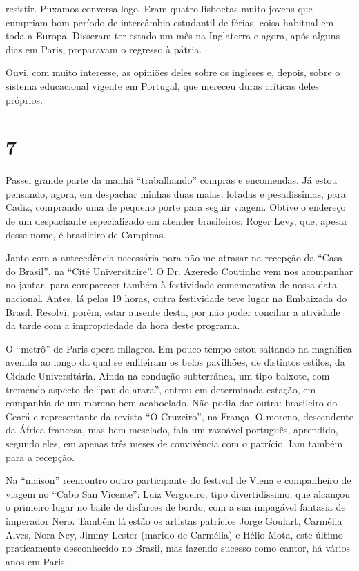 resistir. Puxamos conversa logo. Eram quatro lisboetas muito jovens que cumpriam bom período de intercâmbio estudantil de férias, coisa habitual em toda a Europa. Disseram ter estado um mês na Inglaterra e agora, após alguns dias em Paris, preparavam o regresso à pátria.

Ouvi, com muito interesse, as opiniões deles sobre os ingleses e, depois, sobre o sistema educacional vigente em Portugal, que mereceu duras críticas deles próprios.

\section*{7 \adfflatleafright {}}
Passei grande parte da manhã ``trabalhando'' compras e encomendas. Já estou pensando, agora, em despachar minhas duas malas, lotadas e pesadíssimas, para Cadiz, comprando uma de pequeno porte para seguir viagem. Obtive o endereço de um despachante especializado em atender brasileiros: Roger Levy, que, apesar desse nome, é brasileiro de Campinas.

Janto com a antecedência necessária para não me atrasar na recepção da ``Casa do Brasil'', na ``Cité Universitaire''. O Dr. Azeredo Coutinho vem nos acompanhar no jantar, para comparecer também à festividade comemorativa de nossa data nacional. Antes, lá pelas 19 horas, outra festividade teve lugar na Embaixada do Brasil. Resolvi, porém, estar ausente desta, por não poder conciliar a atividade da tarde com a impropriedade da hora deste programa.

O ``metrô'' de Paris opera milagres. Em pouco tempo estou saltando na magnífica avenida ao longo da qual se enfileiram os belos pavilhões, de distintos estilos, da Cidade Universitária. Ainda na condução subterrânea, um tipo baixote, com tremendo aspecto de ``pau de arara'', entrou em determinada estação, em companhia de um moreno bem acaboclado. Não podia dar outra: brasileiro do Ceará e representante da revista ``O Cruzeiro'', na França. O moreno, descendente da África francesa, mas bem mesclado, fala um razoável português, aprendido, segundo eles, em apenas três meses de convivência com o patrício. Iam também para a recepção.

Na ``maison'' reencontro outro participante do festival de Viena e companheiro de viagem no ``Cabo San Vicente'': Luiz Vergueiro, tipo divertidíssimo, que alcançou o primeiro lugar no baile de disfarces de bordo, com a sua impagável fantasia de imperador Nero. Também lá estão os artistas patrícios Jorge Goulart, Carmélia Alves, Nora Ney, Jimmy Lester (marido de Carmélia) e Hélio Mota, este último praticamente desconhecido no Brasil, mas fazendo sucesso como cantor, há vários anos em Paris.

